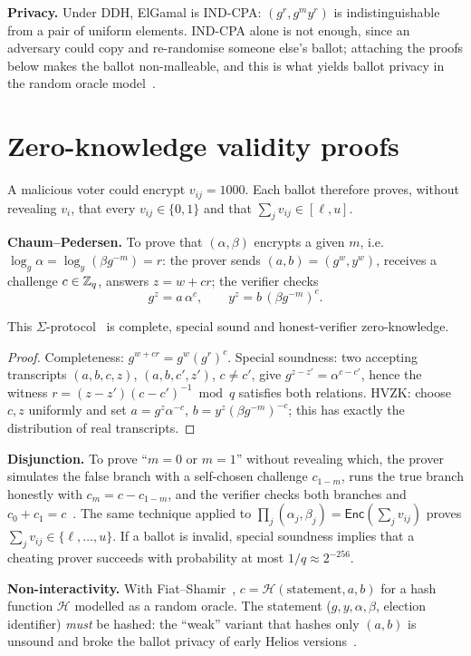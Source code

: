 \documentclass[10pt,twocolumn]{article}
\newcommand{\Enc}{\mathsf{Enc}}
\begin{document}
\textbf{Privacy.} Under DDH, ElGamal is IND-CPA: $(g^r,g^my^r)$ is indistinguishable from a pair of uniform elements. IND-CPA alone is not enough, since an adversary could copy and re-randomise someone else's ballot; attaching the proofs below makes the ballot non-malleable, and this is what yields ballot privacy in the random oracle model~\cite{bernhard2012}.

\section{Zero-knowledge validity proofs}
A malicious voter could encrypt $v_{ij}=1000$. Each ballot therefore proves, without revealing $v_i$, that every $v_{ij}\in\{0,1\}$ and that $\sum_jv_{ij}\in[\ell,u]$.

\textbf{Chaum--Pedersen.} To prove that $(\alpha,\beta)$ encrypts a given $m$, i.e.\ $\log_g\alpha=\log_y(\beta g^{-m})=r$: the prover sends $(a,b)=(g^w,y^w)$, receives a challenge $c\in\mathbb{Z}_q$, answers $z=w+cr$; the verifier checks
\begin{equation}
g^z=a\,\alpha^c,\qquad y^z=b\,(\beta g^{-m})^c .
\end{equation}
\begin{proposition}
This $\Sigma$-protocol~\cite{chaum1992} is complete, special sound and honest-verifier zero-knowledge.
\end{proposition}
\begin{proof}
Completeness: $g^{w+cr}=g^w(g^r)^c$. Special soundness: two accepting transcripts $(a,b,c,z)$, $(a,b,c',z')$, $c\neq c'$, give $g^{z-z'}=\alpha^{c-c'}$, hence the witness $r=(z-z')(c-c')^{-1}\bmod q$ satisfies both relations. HVZK: choose $c,z$ uniformly and set $a=g^z\alpha^{-c}$, $b=y^z(\beta g^{-m})^{-c}$; this has exactly the distribution of real transcripts.
\end{proof}
\textbf{Disjunction.} To prove ``$m=0$ or $m=1$'' without revealing which, the prover simulates the false branch with a self-chosen challenge $c_{1-m}$, runs the true branch honestly with $c_m=c-c_{1-m}$, and the verifier checks both branches and $c_0+c_1=c$~\cite{cds1994}. The same technique applied to $\prod_j(\alpha_j,\beta_j)=\Enc(\sum_jv_{ij})$ proves $\sum_jv_{ij}\in\{\ell,\dots,u\}$. If a ballot is invalid, special soundness implies that a cheating prover succeeds with probability at most $1/q\approx2^{-256}$.

\textbf{Non-interactivity.} With Fiat--Shamir~\cite{fiatshamir1986}, $c=\mathcal H(\text{statement},a,b)$ for a hash function $\mathcal H$ modelled as a random oracle. The statement ($g,y,\alpha,\beta$, election identifier) \emph{must} be hashed: the ``weak'' variant that hashes only $(a,b)$ is unsound and broke the ballot privacy of early Helios versions~\cite{bernhard2012}.
\end{document}
